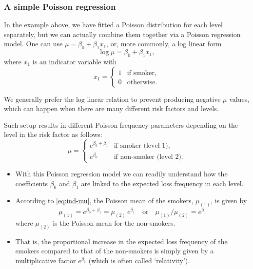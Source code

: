 \documentclass[ignorenonframetext,]{beamer}
\begin{document}
\begin{frame}[allowframebreaks]
\frametitle{A simple Poisson regression}

In the example above, we have fitted a Poisson distribution for each level separately, but we can actually combine them together via a Poisson regression model. One can use $\mu=\beta_0+\beta_1 x_1$, or, more commonly, a log linear form
$$
\log \mu=\beta_0+\beta_1 x_1,
$$
where $x_1$ is an indicator variable with
$$
x_1=
\begin{cases}
     1 & \text{if smoker}, \\
     0 & \text{otherwise}.
\end{cases}
$$

We generally prefer the  log linear relation to prevent producing negative $\mu$ values, which can happen when there are many different risk factors and levels.

\framebreak

Such setup results in different Poisson frequency parameters depending on the level in the risk factor as follows:
\begin{equation} \label{eq:ind-mu}
\mu= \begin{cases}
     e^{\beta_0+\beta_1} & \text{if smoker (level 1)}, \\
     e^{\beta_0} & \text{if non-smoker (level 2)} .
\end{cases} 
\end{equation}

\framebreak


\begin{itemize}
\item With this Poisson regression model we can readily understand how the coefficients $\beta_0$ and $\beta_1$ are linked to the expected loss frequency in each level. 
\item According to \eqref{eq:ind-mu}, the Poisson mean of the smokers, $\mu_{(1)}$, is given by
$$
\mu_{(1)}=e^{\beta_0+\beta_1}=\mu_{(2)} \,e^{\beta_1} \quad \text{or}\quad  \mu_{(1)}/\mu_{(2)} =e^{\beta_1}
$$
where $\mu_{(2)}$ is the Poisson mean for the non-smokers. 
\item That is, the proportional increase in the expected loss frequency of the smokers compared to that of the non-smokers is simply given by a multiplicative factor $e^{\beta_1}$ (which is often called `relativity').

\end{itemize}


\end{frame}
\end{document}

